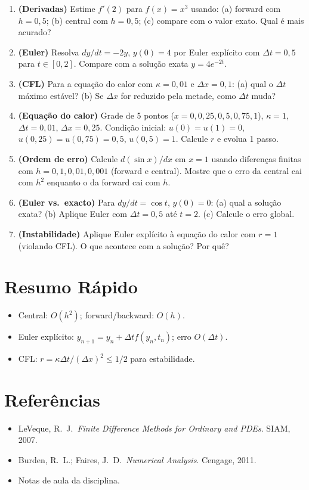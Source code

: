 \documentclass[12pt,a4paper]{article}
\begin{document}
\begin{enumerate}
  \item \textbf{(Derivadas)} Estime $f'(2)$ para $f(x) = x^3$ usando: (a) forward com $h=0{,}5$; (b) central com $h=0{,}5$; (c) compare com o valor exato. Qual \'e mais acurado?
  
  \item \textbf{(Euler)} Resolva $dy/dt = -2y$, $y(0)=4$ por Euler expl\'icito com $\Delta t = 0{,}5$ para $t \in [0, 2]$. Compare com a solu\c{c}\~ao exata $y=4e^{-2t}$.
  
  \item \textbf{(CFL)} Para a equa\c{c}\~ao do calor com $\kappa=0{,}01$ e $\Delta x = 0{,}1$: (a) qual o $\Delta t$ m\'aximo est\'avel? (b) Se $\Delta x$ for reduzido pela metade, como $\Delta t$ muda?
  
  \item \textbf{(Equa\c{c}\~ao do calor)} Grade de 5 pontos ($x = 0, 0{,}25, 0{,}5, 0{,}75, 1$), $\kappa=1$, $\Delta t=0{,}01$, $\Delta x=0{,}25$. Condi\c{c}\~ao inicial: $u(0)=u(1)=0$, $u(0{,}25)=u(0{,}75)=0{,}5$, $u(0{,}5)=1$. Calcule $r$ e evolua 1 passo.
  
  \item \textbf{(Ordem de erro)} Calcule $d(\sin x)/dx$ em $x=1$ usando diferen\c{c}as finitas com $h=0{,}1, 0{,}01, 0{,}001$ (forward e central). Mostre que o erro da central cai com $h^2$ enquanto o da forward cai com $h$.
  
  \item \textbf{(Euler vs.\ exacto)} Para $dy/dt = \cos t$, $y(0)=0$: (a) qual a solu\c{c}\~ao exata? (b) Aplique Euler com $\Delta t=0{,}5$ at\'e $t=2$. (c) Calcule o erro global.
  
  \item \textbf{(Instabilidade)} Aplique Euler expl\'icito \`a equa\c{c}\~ao do calor com $r=1$ (violando CFL). O que acontece com a solu\c{c}\~ao? Por qu\^e?
\end{enumerate}

\section*{Resumo R\'apido}
\begin{itemize}
  \item Central: $O(h^2)$; forward/backward: $O(h)$.
  \item Euler expl\'icito: $y_{n+1} = y_n + \Delta t f(y_n, t_n)$; erro $O(\Delta t)$.
  \item CFL: $r = \kappa\Delta t/(\Delta x)^2 \le 1/2$ para estabilidade.
\end{itemize}

\section*{Refer\^encias}
\begin{itemize}
  \item LeVeque, R.\ J.\ \textit{Finite Difference Methods for Ordinary and PDEs}. SIAM, 2007.
  \item Burden, R.\ L.; Faires, J.\ D.\ \textit{Numerical Analysis}. Cengage, 2011.
  \item Notas de aula da disciplina.
\end{itemize}
\end{document}
